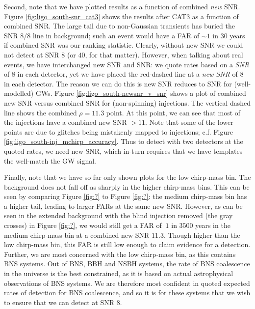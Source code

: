Second, note that we have plotted results as a function of combined \emph{new} \ac{SNR}. Figure \ref{fig:ligo_south-snr_cat3} shows the results after CAT3 as a function of combined \ac{SNR}. The large tail due to non-Gaussian transients has buried the \ac{SNR} 8/8 line in background; such an event would have a \ac{FAR} of $\sim1$ in $30$ years if combined \ac{SNR} was our ranking statistic. Clearly, without new \ac{SNR} we could not detect at \ac{SNR} $8$ (or $40$, for that matter). However, when talking about real events, we have interchanged new \ac{SNR} and \ac{SNR}: we quote rates based on a \emph{\ac{SNR}} of $8$ in each detector, yet we have placed the red-dashed line at a \emph{new \ac{SNR}} of $8$ in each detector. The reason we can do this is new \ac{SNR} reduces to \ac{SNR} for (well-modelled) \acp{GW}. Figure \ref{fig:ligo_south-newsnr_v_snr} shows a plot of combined new \ac{SNR} versus combined \ac{SNR} for (non-spinning) injections. The vertical dashed line shows the combined $\rho = 11.3$ point. At this point, we can see that most of the injections have a combined new \ac{SNR} $> 11$. Note that some of the lower points are due to glitches being mistakenly mapped to injections; c.f. Figure \ref{fig:ligo_south-inj_mchirp_accuracy}. Thus to detect with two detectors at the quoted rates, we need new \ac{SNR}, which in-turn requires that we have templates the well-match the \ac{GW} signal.

Finally, note that we have so far only shown plots for the low chirp-mass bin. The background does not fall off as sharply in the higher chirp-mass bins. This can be seen by comparing Figure \ref{fig:?} to Figure \ref{fig:?}: the medium chirp-mass bin has a higher tail, leading to larger \acp{FAR} at the same new \ac{SNR}. However, as can be seen in the extended background with the blind injection removed (the gray crosses) in Figure \ref{fig:?}, we would still get a \ac{FAR} of $~1$ in $3500$ years in the medium chirp-mass bin at a combined new \ac{SNR} $11.3$. Though higher than the low chirp-mass bin, this \ac{FAR} is still low enough to claim evidence for a detection. Further, we are most concerned with the low chirp-mass bin, as this contains \ac{BNS} systems. Out of \ac{BNS}, \ac{BBH} and \ac{NSBH} systems, the rate of \ac{BNS} coalescence in the universe is the best constrained, as it is based on actual astrophysical observations of \ac{BNS} systems. We are therefore most confident in quoted expected rates of detection for \ac{BNS} coalescence, and so it is for these systems that we wish to ensure that we can detect at \ac{SNR} 8.

